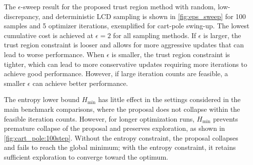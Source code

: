 The $\epsilon$-sweep result for the proposed trust region method with random, low-discrepancy, and deterministic \ac{LCD} sampling is shown in \cref{fig:eps_sweep} for \num{100} samples and \num{5} optimizer iterations, exemplified for cart-pole swing-up.
The lowest cumulative cost is achieved at $\epsilon = 2$ for all sampling methods.
If $\epsilon$ is larger, the trust region constraint is looser and allows for more aggressive updates that can lead to worse performance. 
When $\epsilon$ is smaller, the trust region constraint is tighter, which can lead to more conservative updates requiring more iterations to achieve good performance.
However, if large iteration counts are feasible, a smaller $\epsilon$ can achieve better performance.

The entropy lower bound $H_{\min}$ has little effect in the settings considered in the main benchmark comparisons, where the proposal does not collapse within the feasible iteration counts. 
However, for longer optimization runs, $H_{\min}$ prevents premature collapse of the proposal and preserves exploration, as shown in \cref{fig:cart_pole:100step}. Without the entropy constraint, the proposal collapses and fails to reach the global minimum; with the entropy constraint, it retains sufficient exploration to converge toward the optimum.

